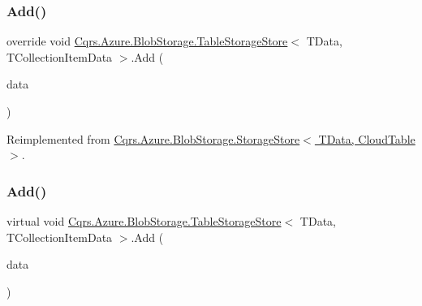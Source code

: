 \subsubsection{\texorpdfstring{Add()}{Add()}\hspace{0.1cm}{\footnotesize\ttfamily [3/6]}}
{\footnotesize\ttfamily override void \hyperlink{classCqrs_1_1Azure_1_1BlobStorage_1_1TableStorageStore}{Cqrs.\+Azure.\+Blob\+Storage.\+Table\+Storage\+Store}$<$ T\+Data, T\+Collection\+Item\+Data $>$.Add (\begin{DoxyParamCaption}\item[{I\+Enumerable$<$ T\+Data $>$}]{data }\end{DoxyParamCaption})\hspace{0.3cm}{\ttfamily [virtual]}}



Reimplemented from \hyperlink{classCqrs_1_1Azure_1_1BlobStorage_1_1StorageStore_a989d749e5f9efc10b1a416feec02657d_a989d749e5f9efc10b1a416feec02657d}{Cqrs.\+Azure.\+Blob\+Storage.\+Storage\+Store$<$ T\+Data, Cloud\+Table $>$}.

\mbox{\label{classCqrs_1_1Azure_1_1BlobStorage_1_1TableStorageStore_a120c6fbb947cf4d37f60335df0182008_a120c6fbb947cf4d37f60335df0182008}} 
\subsubsection{\texorpdfstring{Add()}{Add()}\hspace{0.1cm}{\footnotesize\ttfamily [4/6]}}
{\footnotesize\ttfamily virtual void \hyperlink{classCqrs_1_1Azure_1_1BlobStorage_1_1TableStorageStore}{Cqrs.\+Azure.\+Blob\+Storage.\+Table\+Storage\+Store}$<$ T\+Data, T\+Collection\+Item\+Data $>$.Add (\begin{DoxyParamCaption}\item[{I\+Enumerable$<$ I\+Table\+Entity $>$}]{data }\end{DoxyParamCaption})\hspace{0.3cm}{\ttfamily [virtual]}}

\mbox{\label{classCqrs_1_1Azure_1_1BlobStorage_1_1TableStorageStore_ae48083bacf8a74175122e7618ae2a605_ae48083bacf8a74175122e7618ae2a605}} 
